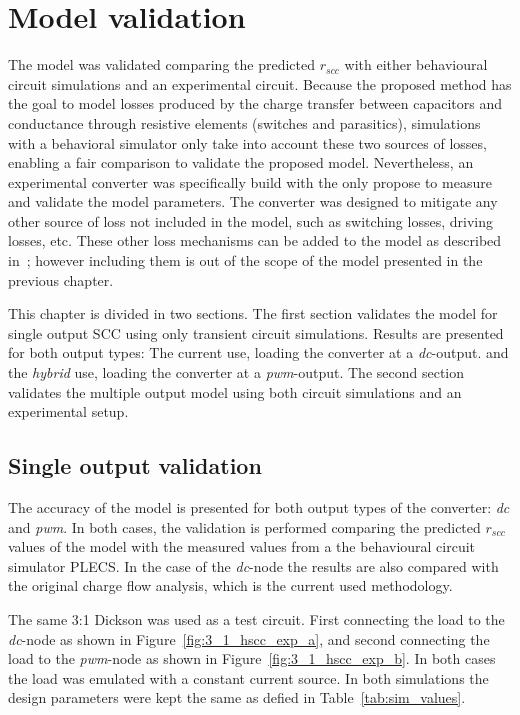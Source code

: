 \chapter{Model validation}
\label{ch:validation}
The model was validated comparing the predicted $r_{scc}$ with either behavioural circuit simulations and an experimental circuit.  Because the proposed method has the goal to model losses produced by the charge transfer between capacitors and conductance through resistive elements (switches and parasitics), simulations with a behavioral simulator only take into account these two sources of losses, enabling a fair comparison to validate the proposed model.  Nevertheless, an experimental converter was specifically build with the only propose to measure and validate the model parameters. The converter was designed to mitigate any other source of loss not included in the model, such as switching losses, driving losses, etc. These other loss mechanisms can be added to the model as described in~\cite{Seeman:EECS-2009-78}; however including them is out of the scope of the model presented in the previous chapter.

This chapter is divided in two sections. The first section validates the model for single output SCC using only transient circuit simulations. Results are presented for both output types: The current use, loading the converter at a \emph{dc}-output. and the \emph{hybrid} use, loading the converter at a \emph{pwm}-output.  The second section validates the multiple output model using both circuit simulations and an experimental setup.

\section{Single output validation}
The accuracy of the model is presented for both output types of the converter:
\emph{dc} and \emph{pwm}. In both cases, the validation is performed comparing the predicted $r_{scc}$ values of the model with the measured values from a the behavioural circuit simulator PLECS. In the case of the \emph{dc}-node the results are also compared with the original charge flow analysis, which is the current used methodology.

The same 3:1 Dickson was used as a test circuit. First connecting the load to the \emph{dc}-node as shown in Figure~\ref{fig:3_1_hscc_exp_a}, and second connecting the load to the \emph{pwm}-node as shown in Figure~\ref{fig:3_1_hscc_exp_b}. In both cases the load was emulated with a constant current source. In both simulations the design parameters were kept the same as defied in Table~\ref{tab:sim_values}.

